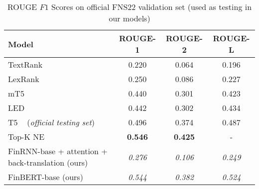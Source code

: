 \begin{table}[ht]
    \centering
    \begin{tabular}{lccc}
        \toprule
        \textbf{Model} & \textbf{ROUGE-1} & \textbf{ROUGE-2} & \textbf{ROUGE-L} \\
        \midrule
            TextRank ~\cite{mihalcea-tarau-2004-textrank} & 0.220 & 0.064 & 0.196 \\
            LexRank ~\cite{Erkan2004LexRankGC} & 0.250 & 0.086 & 0.227 \\
        \midrule
            mT5 ~\cite{foroutan-etal-2022-multilingual} & 0.440 & 0.301 & 0.423 \\
            LED ~\cite{khanna-etal-2022-transformer} & 0.442 & 0.302 & 0.434 \\
            T5 ~\cite{el-haj-etal-2022-financial} (\emph{official testing set}) & 0.496 & 0.374 & 0.487 \\
            Top-K NE ~\cite{shukla-etal-2022-dimsum} & \textbf{0.546} & \textbf{0.425} & - \\
        \midrule
            FinRNN-base + attention + back-translation (ours) & \emph{0.276} & \emph{0.106} & \emph{0.249} \\
            FinBERT-base (ours) & \emph{0.544} & \emph{0.382} & \emph{0.524} \\
        \bottomrule
    \end{tabular}\caption{ROUGE $F1$ Scores on official FNS22 validation set (used as testing in our models)}
    \label{tab:rouge_performance_validation_fns}
\end{table}

